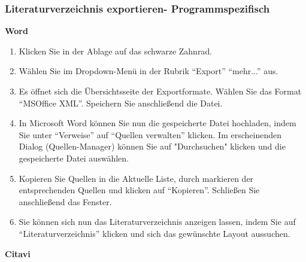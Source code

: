 \documentclass[a4paper,11pt,twoside]{scrbook}
\begin{document}
\subsubsection{Literaturverzeichnis exportieren- Programmspezifisch}
\textbf{Word} 
\begin{enumerate}
    \item Klicken Sie in der Ablage auf das schwarze Zahnrad.
    \item Wählen Sie im Dropdown-Menü in der Rubrik \enquote{Export} \enquote{mehr...} aus.
    \item Es öffnet sich die Übersichtsseite der Exportformate. Wählen Sie das Format \enquote{MSOffice XML}. Speichern Sie anschließend die Datei.
    \item In Microsoft Word können Sie nun die gespeicherte Datei hochladen, indem Sie unter \enquote{Verweise} auf \enquote{Quellen verwalten} klicken. Im erscheinenden Dialog (Quellen-Manager) können Sie auf "Durchsuchen" klicken und die gespeicherte Datei auswählen. 
    \item Kopieren Sie Quellen in die Aktuelle Liste, durch markieren der entsprechenden Quellen und klicken auf \enquote{Kopieren}. Schließen Sie anschließend das Fenster.
    \item Sie können sich nun das Literaturverzeichnis anzeigen lassen, indem Sie auf \enquote{Literaturverzeichnis} klicken und sich das gewünschte Layout aussuchen.
\end{enumerate}
\textbf{Citavi}
\end{document}
